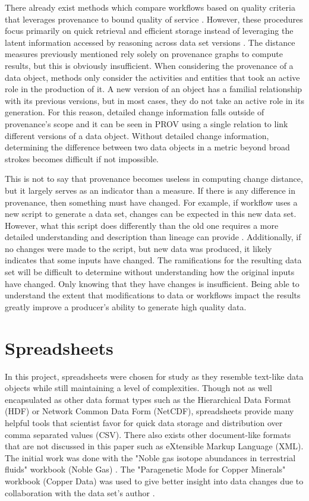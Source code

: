 There already exist methods which compare workflows based on quality criteria that leverages provenance to bound quality of service \cite{2015:CAA:2778374.2778504}.
However, these procedures focus primarily on quick retrieval and efficient storage instead of leveraging the latent information accessed by reasoning across data set versions \cite{tan2004research}.
The distance measures previously mentioned rely solely on provenance graphs to compute results, but this is obviously insufficient.
When considering the provenance of a data object, methods only consider the activities and entities that took an active role in the production of it.
A new version of an object has a familial relationship with its previous versions, but in most cases, they do not take an active role in its generation.
For this reason, detailed change information falls outside of provenance's scope and it can be seen in PROV using a single relation to link different versions of a data object.
Without detailed change information, determining the difference between two data objects in a metric beyond broad strokes becomes difficult if not impossible.

This is not to say that provenance becomes useless in computing change distance, but it largely serves as an indicator than a measure.
If there is any difference in provenance, then something must have changed.
For example, if workflow uses a new script to generate a data set, changes can be expected in this new data set.
However, what this script does differently than the old one requires a more detailed understanding and description than lineage can provide  \cite{Bose:2005:LRS:1057977.1057978}.
Additionally, if no changes were made to the script, but new data was produced, it likely indicates that some inputs have changed.
The ramifications for the resulting data set will be difficult to determine without understanding how the original inputs have changed.
Only knowing that they have changes is insufficient.
Being able to understand the extent that modifications to data or workflows impact the results greatly improve a producer's ability to generate high quality data.

\section{Spreadsheets}

In this project, spreadsheets were chosen for study as they resemble text-like data objects while still maintaining a level of complexities.
Though not as well encapsulated as other data format types such as the Hierarchical Data Format (HDF) or Network Common Data Form (NetCDF), spreadsheets provide many helpful tools that scientist favor for quick data storage and distribution over comma separated values (CSV).
There also exists other document-like formats that are not discussed in this paper such as eXtensible Markup Language (XML).
The initial work was done with the "Noble gas isotope abundances in terrestrial fluids" workbook (Noble Gas) \cite{Polyak2015}.
The "Paragenetic Mode for Copper Minerals" workbook (Copper Data) was used to give better insight into data changes due to collaboration with the data set's author \cite{Morrison2016}.

